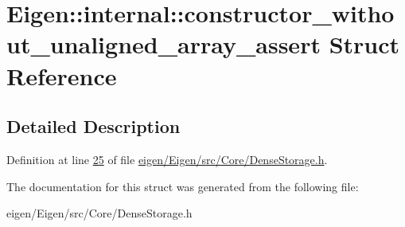 \hypertarget{struct_eigen_1_1internal_1_1constructor__without__unaligned__array__assert}{}\section{Eigen\+:\+:internal\+:\+:constructor\+\_\+without\+\_\+unaligned\+\_\+array\+\_\+assert Struct Reference}
\label{struct_eigen_1_1internal_1_1constructor__without__unaligned__array__assert}


\subsection{Detailed Description}


Definition at line \hyperlink{eigen_2_eigen_2src_2_core_2_dense_storage_8h_source_l00025}{25} of file \hyperlink{eigen_2_eigen_2src_2_core_2_dense_storage_8h_source}{eigen/\+Eigen/src/\+Core/\+Dense\+Storage.\+h}.



The documentation for this struct was generated from the following file\+:\begin{DoxyCompactItemize}
\item 
eigen/\+Eigen/src/\+Core/\+Dense\+Storage.\+h\end{DoxyCompactItemize}
